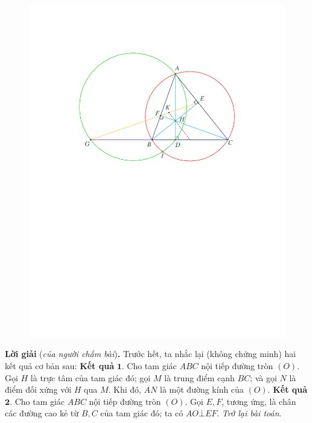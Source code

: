 \begin{multicols}{2}
\begin{figure}[H]
		\includegraphics[width= 1\linewidth]{P595}
		\vspace*{-10pt}
	\end{figure}
	\textbf{\color{thachthuctoanhoc}Lời giải} (\textit{của người chấm bài})\textbf{\color{thachthuctoanhoc}.}
	\vskip 0.05cm
	Trước hết, ta nhắc lại (không chứng minh) hai kết quả cơ bản sau:
	\vskip 0.05cm
	\textbf{\color{thachthuctoanhoc}Kết quả} $\pmb{1.}$ Cho tam giác $ABC$ nội tiếp đường tròn $(O)$. Gọi $H$ là trực tâm của tam giác đó; gọi $M$ là trung điểm cạnh $BC$; và gọi $N$ là điểm đối xứng với $H$ qua $M$. Khi đó, $AN$ là một đường kính của $(O)$.
	\vskip 0.05cm
	\textbf{\color{thachthuctoanhoc}Kết quả} $\pmb{2.}$ Cho tam giác $ABC$ nội tiếp đường tròn $(O)$. Gọi $E, F$, tương ứng, là chân các đường cao kẻ từ $B, C$ của tam giác đó; ta có $AO \bot EF$.
	\vskip 0.05cm
	\textit{Trở lại bài toán}.
	\begin{figure}[H]
		\vspace*{-5pt}
		\centering
		\captionsetup{labelformat= empty, justification=centering}

\end{figure}
\end{multicols}
